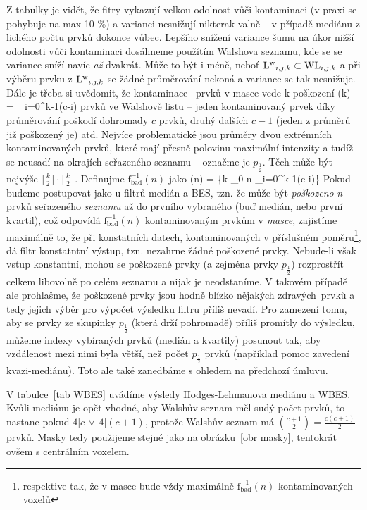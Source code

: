     Z tabulky je vidět, že fitry vykazují velkou odolnost vůči kontaminaci (v praxi se pohybuje na max 10 \%) a varianci nesnižují nikterak valně -- v případě mediánu z lichého počtu prvků dokonce vůbec. Lepšího snížení variance šumu na úkor nižší odolnosti vůči kontaminaci dosáhneme použítím Walshova seznamu, kde se se variance sníží navíc \emph{až} dvakrát. Může to být i méně, neboť ${\mathrm{L^w}_{i,j,k}} \subset {\mathrm{WL}_{i,j,k}}$ a při výběru prvku z ${\mathrm{L^w}_{i,j,k}}$ se žádné průměrování nekoná a variance se tak nesnižuje. Dále je třeba si uvědomit, že kontaminace \kk~prvků v masce vede k poškození
    \beq
    (k) = \sum_{i=0}^{k-1}(c-i)
    \eeq
    prvků ve Walshově listu -- jeden kontaminovaný prvek díky průměrování poškodí dohromady $c$ prvků, druhý dalších $c-1$ (jeden z průměrů již poškozený je) atd. Nejvíce problematické jsou průměry dvou extrémních kontaminovaných prvků, které mají přesně polovinu maximální intenzity a tudíž se neusadí na okrajích seřazeného seznamu -- označme je $p_{\frac{1}{2}}$. Těch může být nejvýše $\lfloor\frac{k}{2}\rfloor\cdot\lceil\frac{k}{2}\rceil$. Definujme $\mathrm{f_{bad}^{-1}}(n)$ jako
    \beq
    (n) = \max\bigg\{k \in \Nn_0 \;\bigg\vert\; n \geq \sum_{i=0}^{k-1}(c-i)\bigg\}
    \eeq
    Pokud budeme postupovat jako u filtrů medián a BES, tzn. že může být \emph{poškozeno} \textit{n} prvků seřazeného \emph{seznamu} až do prvního vybraného (buď medián, nebo první kvartil), což odpovídá $\mathrm{f_{bad}^{-1}}(n)$ kontaminovaným prvkům v \emph{masce}, zajistíme maximálně to, že při konstatních datech, kontaminovaných v příslušném poměru\footnote{respektive tak, že v masce bude vždy maximálně $\mathrm{f_{bad}^{-1}}(n)$ kontaminovaných voxelů}, dá filtr konstatntní výstup, tzn. nezahrne žádné poškozené prvky. Nebude-li však vstup konstantní, mohou se poškozené prvky (a zejména prvky $p_{\frac{1}{2}}$) rozprostřít celkem libovolně po celém seznamu a nijak je neodstaníme. V takovém případě ale prohlašme, že poškozené prvky jsou hodně blízko nějakých \bq zdravých\eq ~prvků a tedy jejich výběr pro výpočet výsledku filtru příliš nevadí. Pro zamezení tomu, aby se prvky ze skupinky $p_{\frac{1}{2}}$ (která drží pohromadě) příliš promítly do výsledku, můžeme indexy vybíraných prvků (medián a kvartily) posunout tak, aby vzdálenost mezi nimi byla větší, než počet $p_{\frac{1}{2}}$ prvků (například pomoc zavedení kvazi-mediánu). Toto ale také zanedbáme s ohledem na předchozí úmluvu.

    V tabulce~\ref{tab WBES} uvádíme výsledy Hodges-Lehmanova mediánu a WBES. Kvůli mediánu je opět vhodné, aby Walshův seznam měl sudý počet prvků, to nastane pokud $4|c \,\vee\, 4|(c+1)$, protože Walshův seznam má ${c+1 \choose 2} = \frac{c(c+1)}{2}$ prvků. Masky tedy použijeme stejné jako na obrázku~\ref{obr masky}, tentokrát ovšem s centrálním voxelem.

